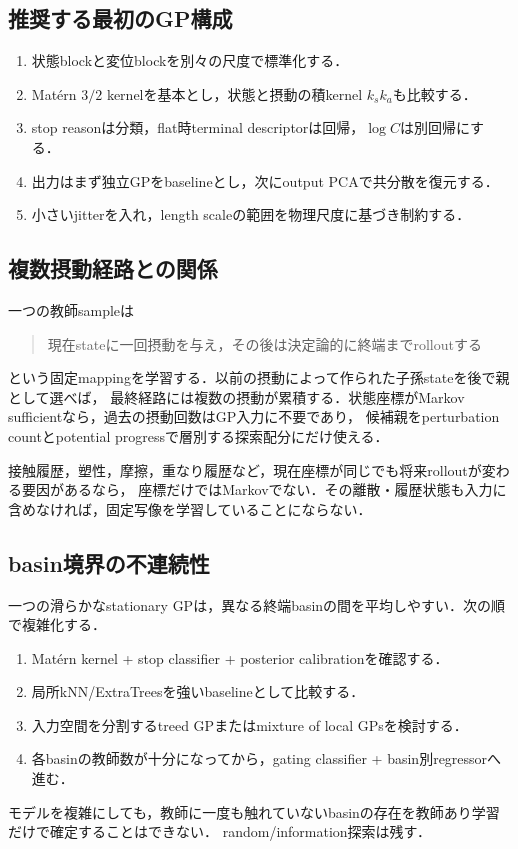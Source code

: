 \documentclass[a4paper,11pt]{ltjsarticle}
\begin{document}
\subsection{推奨する最初のGP構成}

\begin{enumerate}
  \item 状態blockと変位blockを別々の尺度で標準化する．
  \item Mat\'{e}rn \(3/2\) kernelを基本とし，状態と摂動の積kernel
  \(k_s k_a\)も比較する．
  \item stop reasonは分類，flat時terminal descriptorは回帰，\(\log C\)は別回帰にする．
  \item 出力はまず独立GPをbaselineとし，次にoutput PCAで共分散を復元する．
  \item 小さいjitterを入れ，length scaleの範囲を物理尺度に基づき制約する．
\end{enumerate}

\subsection{複数摂動経路との関係}

一つの教師sampleは
\begin{quote}
現在stateに一回摂動を与え，その後は決定論的に終端までrolloutする
\end{quote}
という固定mappingを学習する．以前の摂動によって作られた子孫stateを後で親として選べば，
最終経路には複数の摂動が累積する．状態座標がMarkov sufficientなら，過去の摂動回数はGP入力に不要であり，
候補親をperturbation countとpotential progressで層別する探索配分にだけ使える．

接触履歴，塑性，摩擦，重なり履歴など，現在座標が同じでも将来rolloutが変わる要因があるなら，
座標だけではMarkovでない．その離散・履歴状態も入力に含めなければ，固定写像を学習していることにならない．

\subsection{basin境界の不連続性}

一つの滑らかなstationary GPは，異なる終端basinの間を平均しやすい．次の順で複雑化する．
\begin{enumerate}
  \item Mat\'{e}rn kernel + stop classifier + posterior calibrationを確認する．
  \item 局所kNN/ExtraTreesを強いbaselineとして比較する．
  \item 入力空間を分割するtreed GP\citep{gramacy2008treedgp}またはmixture of local GPsを検討する．
  \item 各basinの教師数が十分になってから，gating classifier + basin別regressorへ進む．
\end{enumerate}
モデルを複雑にしても，教師に一度も触れていないbasinの存在を教師あり学習だけで確定することはできない．
random/information探索は残す．
\end{document}
